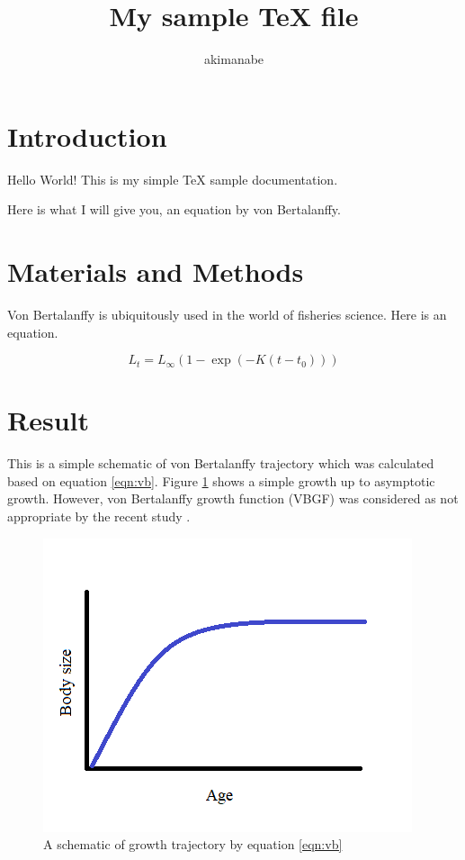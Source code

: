\documentclass[a4paper,dvipdfmx]{jsarticle}
\begin{document}


\title{My sample TeX file}
\author{akimanabe}
\date{}

\maketitle

\section{Introduction}
Hello World! This is my simple TeX sample documentation.

Here is what I will give you, an equation by von Bertalanffy.

\section{Materials and Methods}

Von Bertalanffy is ubiquitously used in the world of fisheries science. Here is an equation.

\begin{equation}
\label{eqn:vb}
L_t = L_\infty (1-\exp(-K(t-t_0)))
\end{equation}

\section{Result}

This is a simple schematic of von Bertalanffy trajectory which was calculated based on equation \ref{eqn:vb}.
Figure \ref{fig:vb} shows a simple growth up to asymptotic growth.
However, von Bertalanffy growth function (VBGF) was considered as not appropriate by the recent study \citep{manabe2018}.

\begin{figure}
  \includegraphics[width = \linewidth]{figs/samplevb.png}
  \caption{A schematic of growth trajectory by equation \ref{eqn:vb}}
  \label{fig:vb}
\end{figure}


\end{document}
